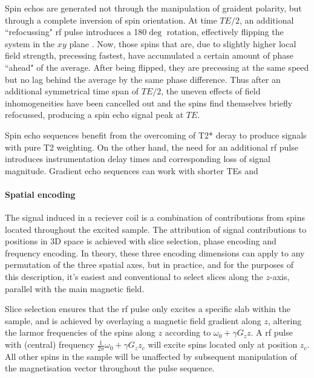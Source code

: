 Spin echos are generated not through the manipulation of graident polarity, but through a complete inversion of spin orientation. 
At time $TE/2$, an additional ``refocussing" \gls{rf} pulse introduces a 180$\deg$ rotation, effectively flipping the system in the $xy$ plane .
Now, those spins that are, due to slightly higher local field strength, precessing fastest, have accumulated a certain amount of phase ``ahead" of the average.
After being flipped, they are precessing at the same speed but no lag behind the average by the same phase difference.
Thus after an additional symmetrical time span of $TE/2$, the uneven effects of field inhomogeneities have been cancelled out and the spins find themselves briefly refocussed, producing a spin echo signal peak at $TE$.

Spin echo sequences benefit from the overcoming of T2* decay to produce signals with pure T2 weighting. 
On the other hand, the need for an additional \gls{rf} pulse introduces instrumentation delay times and corresponding loss of signal magnitude.
Gradient echo sequences can work with shorter TEs  and 


\paragraph*{Spatial encoding}

The signal induced in a reciever coil is a combination of contributions from spins located throughout the excited sample.
The attribution of signal contributions to positions in 3D space is achieved with slice selection, phase encoding and frequency encoding.
In theory, these three encoding dimensions can apply to any permutation of the three spatial axes, but in practice, and for the purposes of this description, it's easiest and conventional to select slices along the $z$-axis, parallel with the main magnetic field. 


Slice selection ensures that the \gls{rf} pulse only excites a specific slab within the sample, and is achieved by overlaying a magnetic field gradient along $z$, altering the larmor frequencies of the spins along $z$ according to $\omega_0 + \gamma G_zz$.
A \gls{rf} pulse with (central) frequency $\frac{1}{2\pi}\omega_0 + \gamma G_zz_c$  will excite spins located only at position $z_c$.
All other spins in the sample will be unaffected by subsequent manipulation of the magnetisation vector throughout the pulse sequence.

